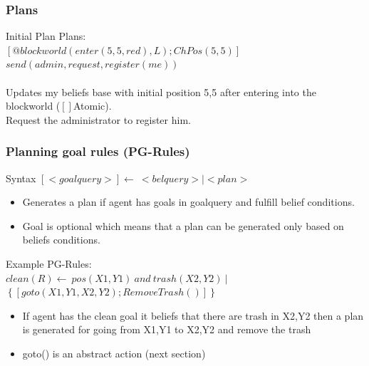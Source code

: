 \documentclass{beamer}
\newcommand\tab[1][1cm]{\hspace*{#1}}
\begin{document}
\begin{frame}
\frametitle{Plans}
	\begin{block}{Initial Plan}
      Plans:\\
      \tab $[@blockworld(enter(5,5,red),L);ChPos(5,5) ]$\\
      \tab $send(admin,request,register(me))$\\~\\
    Updates my beliefs base with initial position 5,5 after entering into the blockworld ($[]$Atomic). \\
    Request the administrator to register him.
    \end{block}
\end{frame}
\begin{frame}
\frametitle{Planning goal rules (PG-Rules)}
	\begin{block}{Syntax}
    	$[<goalquery>]\leftarrow\ <belquery> | <plan> $ \\
        \begin{itemize}
    	\item Generates a plan if agent has goals in goalquery and fulfill belief conditions.
    	\item Goal is optional which means that a plan can be generated only based on beliefs conditions.
        \end{itemize}
    \end{block}
    
    \begin{block}{Example}
    	PG-Rules:\\
        \tab $clean(R)\leftarrow \ pos(X1,Y1)\ and\ trash(X2,Y2)\ |$ 
        \tab \tab $\left\{[goto(X1,Y1,X2,Y2); RemoveTrash()]\right\} $ \\
        \begin{itemize}
        	\item If agent has the clean goal it beliefs that there are trash in X2,Y2 then a plan is generated for going from X1,Y1 to X2,Y2 and remove the trash
        	\item goto() is an abstract action (next section)
        \end{itemize}
	\end{block}
    
\end{frame}
\end{document}
